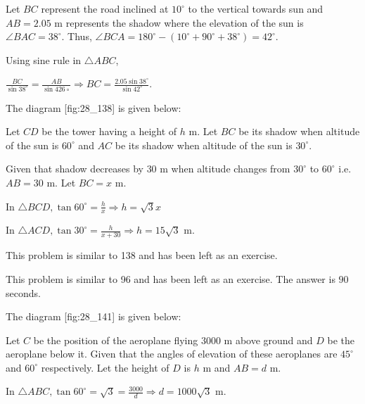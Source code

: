   \startplacefigure[reference=fig:28_137]
    \externalfigure[28_137.pdf]
  \stopplacefigure

  Let $BC$ represent the road inclined at $10^\circ$ to the vertical towards sun and
  $AB = 2.05$ m represents the shadow where the elevation of the sun is $\angle BAC =
  38^\circ$. Thus, $\angle BCA = 180^\circ - (10^\circ + 90^\circ + 38^\circ) = 42^\circ$.

  Using sine rule in $\triangle ABC$,

  $\frac{BC}{\sin38^\circ} = \frac{AB}{\sin426\circ}\Rightarrow BC =
  \frac{2.05\sin38^\circ}{\sin42^\circ}$.

\item The diagram [fig:28_138] is given below:

  \startplacefigure[reference=fig:28_138]
    \externalfigure[28_138.pdf]
  \stopplacefigure

  Let $CD$ be the tower having a height of $h$ m. Let $BC$ be its shadow when altitude
  of the sun is $60^\circ$ and $AC$ be its shadow when altitude of the sun is
  $30^\circ$.

  Given that shadow decreases by $30$ m when altitude changes from $30^\circ$ to
  $60^\circ$ i.e. $AB = 30$ m. Let $BC = x$ m.

  In $\triangle BCD, \tan60^\circ = \frac{h}{x} \Rightarrow h = \sqrt{3}x$

  In $\triangle ACD, \tan30^\circ = \frac{h}{x + 30} \Rightarrow h = 15\sqrt{3}$ m.

\item This problem is similar to 138 and has been left as an exercise.

\item This problem is similar to 96 and has been left as an exercise. The answer is $90$ seconds.

\item The diagram [fig:28_141] is given below:

  \startplacefigure[reference=fig:28_141]
    \externalfigure[28_141.pdf]
  \stopplacefigure

  Let $C$ be the position of the aeroplane flying $3000$ m above ground and $D$ be the
  aeroplane below it. Given that the angles of elevation of these aeroplanes are $45^\circ$ and
  $60^\circ$ respectively. Let the height of $D$ is $h$ m and $AB = d$ m.

  In $\triangle ABC, \tan60^\circ = \sqrt{3} = \frac{3000}{d} \Rightarrow d = 1000\sqrt{3}$ m.

